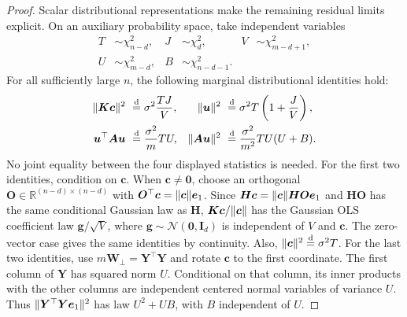 \documentclass{article}
\theoremstyle{plain}
\theoremstyle{definition}
\theoremstyle{definition}
\newcommand{\boldzero}{\mathbf{0}}
\DeclarePairedDelimiter\norm{\lVert}{\rVert}
\def\R{{\mathbb{R}}}
\def\mathbold{\boldsymbol}
\def\cal{\mathcal}
\def\bA{\mathbold{A}}\def\calA{{\cal A}}\def\scrA{{\mathscr A}}\def\Ahat{\widehat{A}}\def\Atil{{\widetilde A}}
\def\bc{\mathbold{c}}\def\chat{\widehat{c}}\def\ctil{\widetilde{c}}
\def\bg{\mathbold{g}}\def\ghat{\widehat{g}}\def\gtil{\widetilde{g}}
\def\bH{\mathbold{H}}\def\calH{{\cal H}}\def\scrH{{\mathscr H}}\def\Hhat{\widehat{H}}\def\Htil{{\widetilde H}}
\def\bI{\mathbold{I}}\def\hbI{{\widehat{\bI}}}\def\tbI{{\widetilde{\bI}}}
\def\bK{\mathbold{K}}\def\hbK{{\widehat{\bK}}}\def\tbK{{\widetilde{\bK}}}
\def\calN{{\cal N}}\def\scrN{{\mathscr N}}\def\Nhat{\widehat{N}}\def\Ntil{{\widetilde N}}\def\Nbar{{\overline N}}
\def\bO{\mathbold{O}}\def\hbO{{\widehat{\bO}}}\def\tbO{{\widetilde{\bO}}}
\def\be{\mathbold{e}}
\def\bu{\mathbold{u}}\def\uhat{\widehat{u}}\def\util{\widetilde{u}}\def\ubar{{\overline u}}
\def\bW{\mathbold{W}}\def\hbW{{\widehat{\bW}}}\def\tbW{{\widetilde{\bW}}}
\def\bY{\mathbold{Y}}\def\hbY{{\widehat{\bY}}}\def\tbY{{\widetilde{\bY}}}
\begin{document}
\begin{proof}
Scalar distributional representations make the remaining residual limits
explicit. On an auxiliary probability space, take independent variables
\begin{align*}
    T&\sim\chi^2_{n-d}, & J&\sim\chi^2_d,
    & V&\sim\chi^2_{m-d+1},\\
    U&\sim\chi^2_{m-d}, & B&\sim\chi^2_{n-d-1}.
\end{align*}
For all sufficiently large $n$, the following marginal distributional
identities hold:
\begin{align*}
    \norm{\bK\bc}^2&\ \stackrel{\rm d}{=}
       \sigma^2\frac{TJ}{V},
    &
    \norm{\bu}^2&\ \stackrel{\rm d}{=}
       \sigma^2T\left(1+\frac JV\right),\\
    \bu^\top\bA\bu&\ \stackrel{\rm d}{=}
       \frac{\sigma^2}{m}TU,
    &
    \norm{\bA\bu}^2&\ \stackrel{\rm d}{=}
       \frac{\sigma^2}{m^2}TU(U+B).
\end{align*}
No joint equality between the four displayed statistics is needed.
For the first two identities, condition on $\bc$. When $\bc\ne\boldzero$,
choose an orthogonal $\bO\in\R^{(n-d)\times(n-d)}$ with
$\bO^\top\bc=\norm{\bc}\be_1$. Since
$\bH\bc=\norm{\bc}\bH\bO\be_1$ and $\bH\bO$ has the same conditional
Gaussian law as $\bH$, $\bK\bc/\norm{\bc}$ has the Gaussian OLS coefficient law
$\bg/\sqrt V$, where $\bg\sim\calN(\boldzero,\bI_d)$ is independent
of $V$ and $\bc$. The zero-vector case gives the same identities by
continuity. Also, $\norm{\bc}^2\stackrel{\rm d}{=}\sigma^2T$.
For the last two identities, use $m\bW_\perp=\bY^\top\bY$ and rotate
$\bc$ to the first coordinate. The first column of $\bY$ has squared
norm $U$. Conditional on that column, its inner products with the other
columns are independent centered normal variables of variance $U$.
Thus $\norm{\bY^\top\bY\be_1}^2$ has law $U^2+UB$, with $B$
independent of $U$.


\end{proof}
\end{document}
